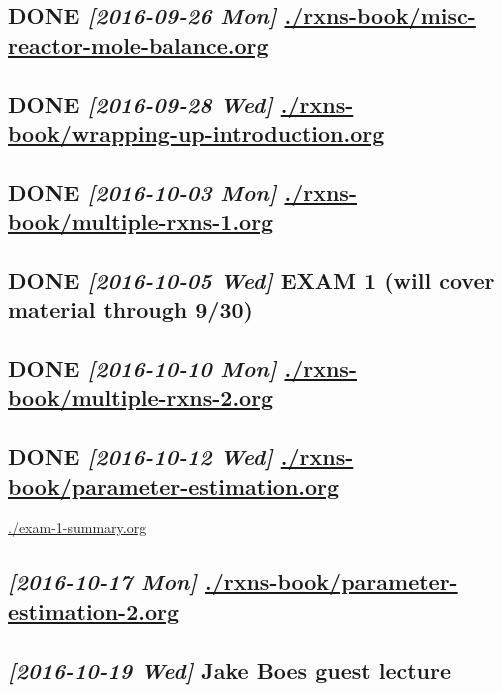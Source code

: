 \documentclass[11pt]{article}
\begin{document}
\subsection{{\bfseries\sffamily DONE} \textit{[2016-09-26 Mon] } \url{./rxns-book/misc-reactor-mole-balance.org}}
\label{sec:orgheadline25}

\subsection{{\bfseries\sffamily DONE} \textit{[2016-09-28 Wed] } \url{./rxns-book/wrapping-up-introduction.org}}
\label{sec:orgheadline26}

\subsection{{\bfseries\sffamily DONE} \textit{[2016-10-03 Mon] } \url{./rxns-book/multiple-rxns-1.org}}
\label{sec:orgheadline27}

\subsection{{\bfseries\sffamily DONE} \textit{[2016-10-05 Wed] } EXAM 1 (will cover material through 9/30)}
\label{sec:orgheadline28}

\subsection{{\bfseries\sffamily DONE} \textit{[2016-10-10 Mon] } \url{./rxns-book/multiple-rxns-2.org}}
\label{sec:orgheadline29}

\subsection{{\bfseries\sffamily DONE} \textit{[2016-10-12 Wed] } \url{./rxns-book/parameter-estimation.org}}
\label{sec:orgheadline30}
\url{./exam-1-summary.org}

\subsection{\textit{[2016-10-17 Mon] } \url{./rxns-book/parameter-estimation-2.org}}
\label{sec:orgheadline31}

\subsection{\textit{[2016-10-19 Wed] } Jake Boes guest lecture}
\label{sec:orgheadline32}
\end{document}
